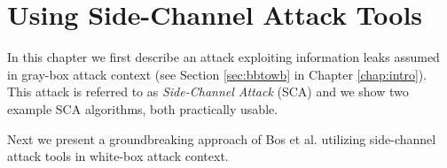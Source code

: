 \chapter{Using Side-Channel Attack Tools}
\label{chap:attack}

In this chapter we first describe an attack exploiting information leaks assumed in gray-box attack context (see Section \ref{sec:bbtowb} in Chapter \ref{chap:intro}). This attack is referred to as {\em Side-Channel Attack} (SCA) and we show two example SCA algorithms, both practically usable.

Next we present a groundbreaking approach of Bos et al. \cite{bos2015differential} utilizing side-channel attack tools in white-box attack context.




